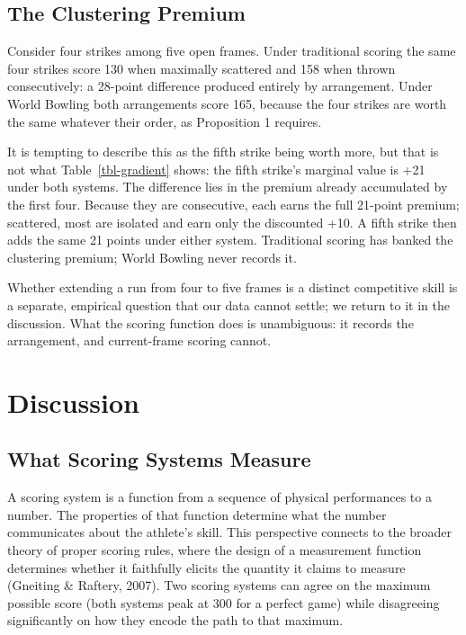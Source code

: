 \documentclass[
  letterpaper,
  DIV=11,
  numbers=noendperiod]{scrartcl}
\begin{document}
\subsection{The Clustering Premium}\label{the-clustering-premium}

Consider four strikes among five open frames. Under traditional scoring
the same four strikes score 130 when maximally scattered and 158 when
thrown consecutively: a 28-point difference produced entirely by
arrangement. Under World Bowling both arrangements score 165, because
the four strikes are worth the same whatever their order, as Proposition
1 requires.

It is tempting to describe this as the fifth strike being worth more,
but that is not what Table~\ref{tbl-gradient} shows: the fifth strike's
marginal value is +21 under both systems. The difference lies in the
premium already accumulated by the first four. Because they are
consecutive, each earns the full 21-point premium; scattered, most are
isolated and earn only the discounted +10. A fifth strike then adds the
same 21 points under either system. Traditional scoring has banked the
clustering premium; World Bowling never records it.

Whether extending a run from four to five frames is a distinct
competitive skill is a separate, empirical question that our data cannot
settle; we return to it in the discussion. What the scoring function
does is unambiguous: it records the arrangement, and current-frame
scoring cannot.

\section{Discussion}\label{discussion}

\subsection{What Scoring Systems
Measure}\label{what-scoring-systems-measure}

A scoring system is a function from a sequence of physical performances
to a number. The properties of that function determine what the number
communicates about the athlete's skill. This perspective connects to the
broader theory of proper scoring rules, where the design of a
measurement function determines whether it faithfully elicits the
quantity it claims to measure (Gneiting \& Raftery, 2007). Two scoring
systems can agree on the maximum possible score (both systems peak at
300 for a perfect game) while disagreeing significantly on how they
encode the path to that maximum.
\end{document}
